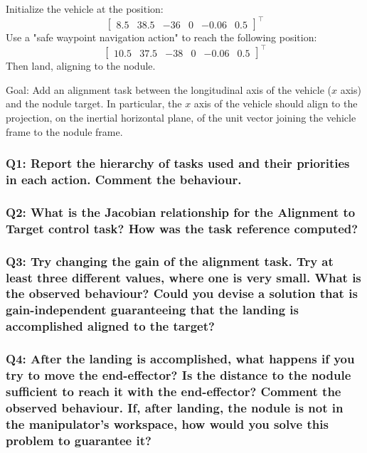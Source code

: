 \documentclass{article}
\begin{document}
Initialize the vehicle at the position:
\begin{displaymath}
\begin{bmatrix} 8.5 & 38.5 & -36 & 0 & -0.06 & 0.5 \end{bmatrix}^\top
\end{displaymath}
Use a "safe waypoint navigation action" to reach the following position:
\begin{displaymath}
\begin{bmatrix} 10.5 & 37.5 & -38 & 0 & -0.06 & 0.5 \end{bmatrix}^\top
\end{displaymath}
Then land, aligning to the nodule.

Goal: Add an alignment task between the longitudinal axis of the vehicle ($x$ axis) and the nodule target. In particular, the $x$ axis of the vehicle should align to the projection, on the inertial horizontal plane, of the unit vector joining the vehicle frame to the nodule frame.

\subsubsection{Q1: Report the hierarchy of tasks used and their priorities in each action. Comment the behaviour.}

\subsubsection{Q2: What is the Jacobian relationship for the Alignment to Target control task? How was the task reference computed?}

\subsubsection{Q3: Try changing the gain of the alignment task. Try at least three different values, where one is very small. What is the observed behaviour? Could you devise a solution that is gain-independent guaranteeing that the landing is accomplished aligned to the target?}

\subsubsection{Q4: After the landing is accomplished, what happens if you try to move the end-effector? Is the distance to the nodule sufficient to reach it with the end-effector? Comment the observed behaviour. If, after landing, the nodule is not in the manipulator's workspace, how would you solve this problem to guarantee it?}
\end{document}
